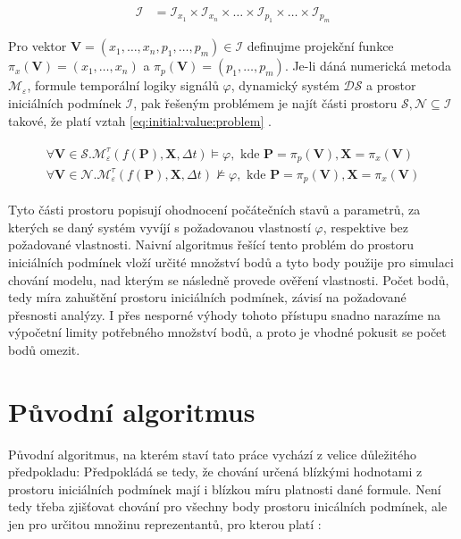 \begin{align}
\mathcal{I} &= \mathcal{I}_{x_1} \times \mathcal{I}_{x_n} \times \ldots \times \mathcal{I}_{p_1} \times \ldots \times \mathcal{I}_{p_m}
\end{align}

Pro vektor $\mathbf{V} = (x_1, \ldots, x_n, p_1, \ldots, p_m) \in \mathcal{I}$ definujme projekční funkce $\pi_x(\mathbf{V}) = (x_1, \ldots, x_n)$
a $\pi_p(\mathbf{V}) = (p_1, \ldots, p_m)$. Je-li dáná numerická metoda $\mathcal{M}_\varepsilon$,
formule temporální logiky signálů $\varphi$, dynamický systém $\mathcal{DS}$
a prostor iniciálních podmínek $\mathcal{I}$, pak řešeným problémem je najít
části prostoru $\mathcal{S}, \mathcal{N} \subseteq \mathcal{I}$ takové, že platí
vztah \ref{eq:initial:value:problem} \cite[str. 23]{drazan2011}.

\begin{align}\label{eq:initial:value:problem}
\begin{array}{ll}
\forall \mathbf{V} \in \mathcal{S} . \mathcal{M}^\tau_\varepsilon(f(\mathbf{P}), \mathbf{X}, \Delta t) \models \varphi, \textrm{~kde~} \mathbf{P} = \pi_p(\mathbf{V}), \mathbf{X} = \pi_x(\mathbf{V}) \\
\forall \mathbf{V} \in \mathcal{N} . \mathcal{M}^\tau_\varepsilon(f(\mathbf{P}), \mathbf{X}, \Delta t) \not\models \varphi, \textrm{~kde~} \mathbf{P} = \pi_p(\mathbf{V}), \mathbf{X} = \pi_x(\mathbf{V})
\end{array}
\end{align}

Tyto části prostoru popisují ohodnocení počátečních stavů a parametrů, za kterých se daný systém vyvíjí
s požadovanou vlastností $\varphi$, respektive bez po\-ža\-do\-vané vlastnosti. Naivní algoritmus řešící
tento problém do prostoru iniciálních podmínek vloží určité množství bodů a tyto body
použije pro simulaci chování modelu, nad kterým se následně provede ověření vlastnosti.
Počet bodů, tedy míra zahuštění prostoru iniciálních podmínek, závisí na požadované přesnosti
analýzy. I přes nesporné výhody tohoto přístupu snadno narazíme na výpočetní limity
potřebného množství bodů, a proto je vhodné pokusit se počet bodů omezit.


\section{Původní algoritmus}

Původní algoritmus, na kterém staví tato práce vychází z velice důležitého předpokladu:
 Předpokládá se tedy, že chování určená blízkými
hodnotami z prostoru iniciálních podmínek mají i blízkou míru platnosti dané formule.
Není tedy třeba zjišťovat chování pro všechny body prostoru inicálních podmínek,
ale jen pro určitou množinu reprezentantů, pro kterou platí \cite[str. 25]{drazan2011}:

